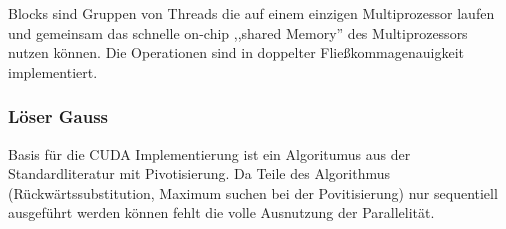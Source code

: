 \documentclass[journal]{IEEEtran}
\begin{document}
Blocks sind Gruppen von Threads die auf einem einzigen Multiprozessor laufen
und gemeinsam das schnelle on-chip ,,shared Memory''
des Multiprozessors nutzen können. \cite{cudapg}
Die Operationen sind in doppelter Fließkommagenauigkeit implementiert.







\subsubsection{Löser Gauss}
Basis für die CUDA Implementierung ist ein Algoritumus aus der
Standardliteratur \cite{sedgewick} mit Pivotisierung.
Da Teile des Algorithmus (Rückwärtssubstitution, Maximum suchen bei der
Povitisierung) nur sequentiell ausgeführt werden können fehlt die volle
Ausnutzung der Parallelität.

%
%



%
%
\end{document}
